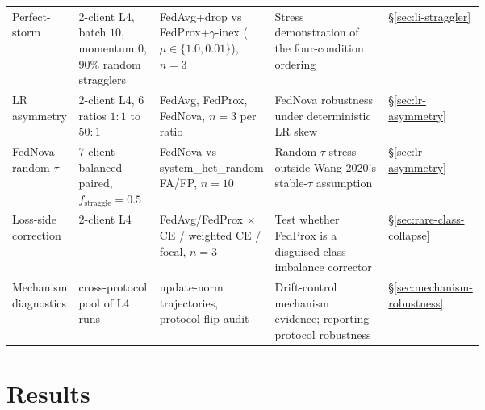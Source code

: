 \documentclass[11pt,a4paper]{report}
\begin{document}
\begin{table}[H]
{\begin{tabular}{l p{0.18\linewidth} p{0.22\linewidth} p{0.28\linewidth} l}
Perfect-storm                    & 2-client L4, batch $10$, momentum $0$, $90\%$ random stragglers & FedAvg+drop vs FedProx+$\gamma$-inex ($\mu \in \{1.0, 0.01\}$), $n = 3$ & Stress demonstration of the four-condition ordering                        & §\ref{sec:li-straggler}                         \\
LR asymmetry                     & 2-client L4, 6 ratios $1{:}1$ to $50{:}1$    & FedAvg, FedProx, FedNova, $n = 3$ per ratio              & FedNova robustness under deterministic LR skew                                & §\ref{sec:lr-asymmetry}                         \\
FedNova random-$\tau$            & 7-client balanced-paired, $f_{\textrm{straggle}} = 0.5$ & FedNova vs system\_het\_random FA/FP, $n = 10$           & Random-$\tau$ stress outside Wang 2020's stable-$\tau$ assumption             & §\ref{sec:lr-asymmetry}                         \\
Loss-side correction             & 2-client L4                                  & FedAvg/FedProx $\times$ CE / weighted CE / focal, $n = 3$ & Test whether FedProx is a disguised class-imbalance corrector                & §\ref{sec:rare-class-collapse}                  \\
Mechanism diagnostics            & cross-protocol pool of L4 runs               & update-norm trajectories, protocol-flip audit             & Drift-control mechanism evidence; reporting-protocol robustness               & §\ref{sec:mechanism-robustness}                  \\
\hline
\end{tabular}%
}
\end{table}




\chapter{Results}
\label{ch:results}
\end{document}

